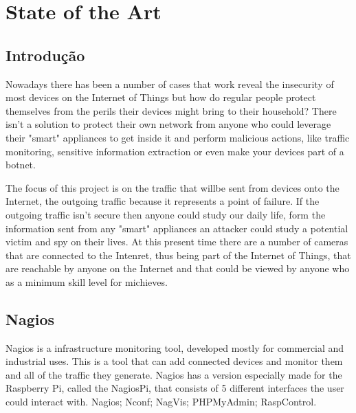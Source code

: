 \chapter{State of the Art}
\label{chap:state-of-art}

\section{Introdução}
\label{chap2:sec:intro}
Nowadays there has been a number of cases that work reveal the insecurity of
most devices on the Internet of Things
but how do regular people protect themselves from the perils their devices
might bring to their household? There isn't a solution to protect their own
network from anyone who could leverage their "smart" appliances to get inside
it and perform malicious actions, like traffic monitoring, sensitive
information extraction or even make your devices part of a botnet.

The focus of this project is on the traffic that willbe sent from devices onto
the Internet, the outgoing traffic because it represents a point of failure.
If the outgoing traffic isn't secure then anyone could study our daily life,
form the information sent from any "smart" appliances an attacker could study
a potential victim and spy on their lives. At this present time there are a
number of cameras that are connected to the Intenret, thus being part of the
Internet of Things, that are reachable by anyone on the Internet and that
could be viewed by anyone who as a minimum skill level for michieves.

\section{Nagios}
\label{chap2:sec:nag}
Nagios is a infrastructure monitoring tool, developed mostly for commercial and
industrial uses. This is a tool that can add connected devices and monitor them
and all of the traffic they generate. Nagios has a version especially made for
the Raspberry Pi, called the NagiosPi, that consists of 5 different interfaces
the user could interact with.
Nagios;
Nconf;
NagVis;
PHPMyAdmin;
RaspControl.


